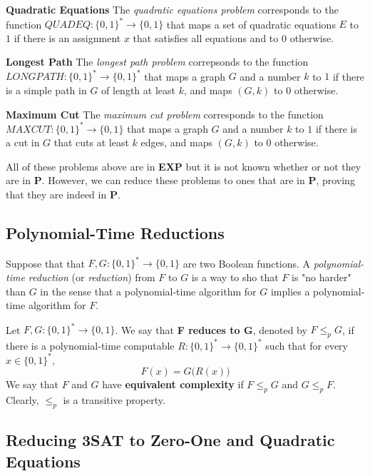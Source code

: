   \textbf{Quadratic Equations} The \textit{quadratic equations problem} corresponds to the function $QUADEQ: \{0,1\}^* \to \{0,1\}$ that maps a set of quadratic equations $E$ to $1$ if there is an assignment $x$ that satisfies all equations and to $0$ otherwise. 

  \textbf{Longest Path} The \textit{longest path problem} correpsonds to the function $LONGPATH: \{0,1\}^* \to \{0,1\}^*$ that maps a graph $G$ and a number $k$ to $1$ if there is a simple path in $G$ of length at least $k$, and maps $(G, k)$ to $0$ otherwise. 

  \textbf{Maximum Cut} The \textit{maximum cut problem} corresponds to the function $MAXCUT: \{0,1\}^* \to \{0,1\}$ that maps a graph $G$ and a number $k$ to $1$ if there is a cut in $G$ that cuts at least $k$ edges, and maps $(G, k)$ to $0$ otherwise. 

  All of these problems above are in \textbf{EXP} but it is not known whether or not they are in \textbf{P}. However, we can reduce these problems to ones that are in \textbf{P}, proving that they are indeed in \textbf{P}. 

\subsection{Polynomial-Time Reductions}

  Suppose that that $F, G: \{0,1\}^* \to \{0,1\}$ are two Boolean functions. A \textit{polynomial-time reduction} (or \textit{reduction}) from $F$ to $G$ is a way to sho that $F$ is "no harder" than $G$ in the sense that a polynomial-time algorithm for $G$ implies a polynomial-time algorithm for $F$. 

  \begin{definition}
    \label{def:polynomial-time-reductions}
  Let $F, G: \{0,1\}^* \to \{0,1\}$. We say that \textbf{F reduces to G}, denoted by $F \leq_p G$, if there is a polynomial-time computable $R: \{0,1\}^* \to \{0,1\}^*$ such that for every $x \in \{0,1\}^*$, 
  \begin{equation}
    F(x) = G \big(R(x)\big)
  \end{equation}
  We say that $F$ and $G$ have \textbf{equivalent complexity} if $F \leq_p G$ and $G \leq_p F$. Clearly, $\leq_p$ is a transitive property. 
  \end{definition}

\subsection{Reducing 3SAT to Zero-One and Quadratic Equations}

